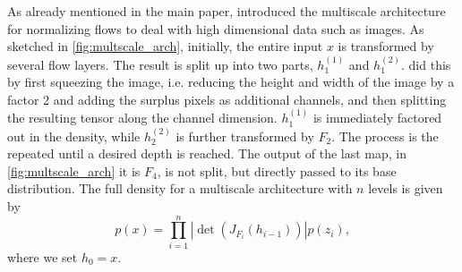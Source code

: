 \documentclass[twoside]{article}
\begin{document}
As already mentioned in the main paper, \cite{Dinh2017} introduced the multiscale architecture for normalizing flows to deal with high dimensional data such as images. As sketched in \autoref{fig:multscale_arch}, initially, the entire input $x$ is transformed by several flow layers. The result is split up into two parts, $h_1^{(1)}$ and $h_1^{(2)}$. \cite{Dinh2017} did this by first squeezing the image, i.e. reducing the height and width of the image by a factor 2 and adding the surplus pixels as additional channels, and then splitting the resulting tensor along the channel dimension. $h_1^{(1)}$ is immediately factored out in the density, while $h_2^{(2)}$ is further transformed by $F_2$. The process is the repeated until a desired depth is reached. The output of the last map, in \autoref{fig:multscale_arch} it is $F_4$, is not split, but directly passed to its base distribution. The full density for a multiscale architecture with $n$ levels is given by
\begin{equation*}
	p(x) = \prod_{i=1}^{n} \left| \det\left( J_{F_i}(h_{i-1})\right) \right| p(z_i),
\end{equation*}
where we set $h_0 = x$.
\end{document}
